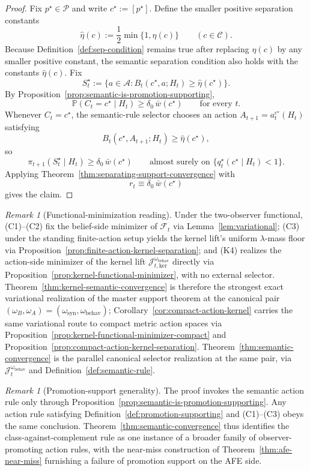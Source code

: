 \documentclass[11pt]{article}
\theoremstyle{definition}
\theoremstyle{remark}
\newtheorem{remark}[theorem]{Remark}
\newcommand{\Acal}{\mathcal{A}}
\newcommand{\Ccal}{\mathcal{C}}
\newcommand{\Pcal}{\mathcal{P}}
\newcommand{\Prob}{\mathbb{P}}
\begin{document}
\begin{proof}
Fix $p^\star\in\Pcal$ and write $c^\star:=[p^\star]$.
Define the smaller positive separation constants
\[
\hat\eta(c):=\frac{1}{2}\min\{1,\eta(c)\}
\qquad
(c\in\Ccal).
\]
Because Definition~\ref{def:sep-condition} remains true after replacing $\eta(c)$ by any smaller positive constant, the semantic separation condition also holds with the constants $\hat\eta(c)$. Fix
\[
S_t^\star:=\{a\in\Acal:B_t(c^\star,a;H_t)\ge \hat\eta(c^\star)\}.
\]
By Proposition~\ref{prop:semantic-is-promotion-supporting},
\[
\Prob(C_t=c^\star\mid H_t)\ge \delta_0\,\bar w(c^\star)
\qquad\text{for every }t.
\]
Whenever $C_t=c^\star$, the semantic-rule selector chooses an action $A_{t+1}=a_t^{c^\star}(H_t)$ satisfying
\[
B_t(c^\star,A_{t+1};H_t)\ge \hat\eta(c^\star),
\]
so
\[
\pi_{t+1}(S_t^\star\mid H_t)\ge \delta_0\,\bar w(c^\star)
\qquad\text{almost surely on }\{q_t^\star(c^\star\mid H_t)<1\}.
\]
Applying Theorem~\ref{thm:separating-support-convergence} with
\[
r_t\equiv \delta_0\,\bar w(c^\star)
\]
gives the claim.
\end{proof}

\begin{remark}[Functional-minimization reading]
\label{rem:functional-payoff}
Under the two-observer functional, (C1)--(C2) fix the belief-side minimizer of $\mathcal F_t$ via Lemma~\ref{lem:variational}; (C3) under the standing finite-action setup yields the kernel lift's uniform $\lambda$-mass floor via Proposition~\ref{prop:finite-action-kernel-separation}; and (K4) realizes the action-side minimizer of the kernel lift $\mathcal J_{t,\mathrm{ker}}^{\omega_{\mathrm{behav}}}$ directly via Proposition~\ref{prop:kernel-functional-minimizer}, with no external selector. Theorem~\ref{thm:kernel-semantic-convergence} is therefore the strongest exact variational realization of the master support theorem at the canonical pair $(\omega_B,\omega_A)=(\omega_{\mathrm{syn}},\omega_{\mathrm{behav}})$; Corollary~\ref{cor:compact-action-kernel} carries the same variational route to compact metric action spaces via Proposition~\ref{prop:kernel-functional-minimizer-compact} and Proposition~\ref{prop:compact-action-kernel-separation}. Theorem~\ref{thm:semantic-convergence} is the parallel canonical selector realization at the same pair, via $\mathcal J_t^{\omega_{\mathrm{behav}}}$ and Definition~\ref{def:semantic-rule}.
\end{remark}

\begin{remark}[Promotion-support generality]
\label{rem:promotion-support}
The proof invokes the semantic action rule only through Proposition~\ref{prop:semantic-is-promotion-supporting}. Any action rule satisfying Definition~\ref{def:promotion-supporting} and (C1)--(C3) obeys the same conclusion. Theorem~\ref{thm:semantic-convergence} thus identifies the class-against-complement rule as one instance of a broader family of observer-promoting action rules, with the near-miss construction of Theorem~\ref{thm:afe-near-miss} furnishing a failure of promotion support on the AFE side.
\end{remark}
\end{document}
